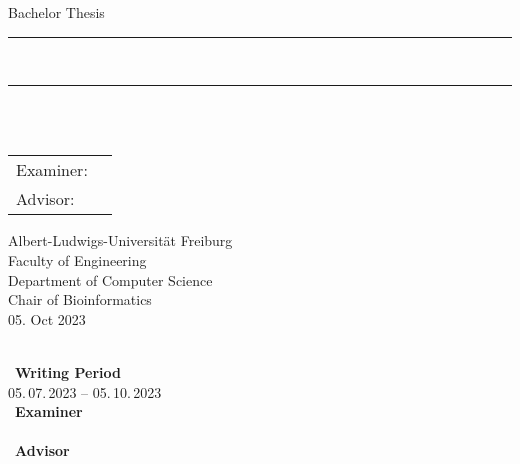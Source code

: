 \begin{titlepage}
	\begin{center}

		\newcommand{\HorizontalLine}{\rule{\linewidth}{0.3mm}}

		{\Large Bachelor Thesis}\\[1.3cm]


		\HorizontalLine \\[0.4cm]
		{ \huge \bfseries \thetitle }
		\HorizontalLine \\[2cm]


		{\Huge \theauthor} \\[2.6cm]


		\begin{tabular}[hc]{>{\huge}l >{\huge}l}
			Examiner: & \firstexaminer \\[0.3cm]
			Advisor:  & \advisers      \\[2.6cm]
		\end{tabular}
		\vfill  %

		\Large {
			Albert-Ludwigs-Universität Freiburg\\
			Faculty of Engineering\\
            Department of Computer Science\\
			Chair of Bioinformatics\\[0.7cm]

			05. Oct 2023
			\\
		}
	\end{center}
\end{titlepage}

\thispagestyle{empty}
\ \vfill \ \\  %
\
\textbf{Writing Period}            \smallskip{} \\
05.\,07.\,2023 -- 05.\,10.\,2023   	 \bigskip{} \\
\
\textbf{Examiner}                  \smallskip{} \\
\firstexaminer                      \bigskip{} \\
\
\textbf{Advisor}                  \smallskip{} \\
\advisers